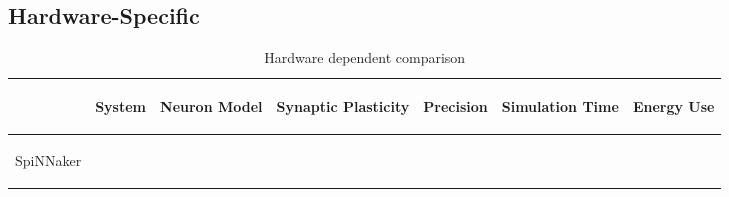 \subsection{Hardware-Specific}
\label{subsec:hw}
\begin{table*}[thb!]
  \caption{Hardware dependent comparison}
  \begin{center}
      \bgroup
      \def\arraystretch{1.4}
    \begin{tabular}{l c c c c c c}
      $ $ & 
       \begin{mycell}{2.0cm} System \end{mycell} & 
       
       \begin{mycell}{2.0cm} Neuron Model \end{mycell} & 
       \begin{mycell}{2.0cm} Synaptic Plasticity \end{mycell} & 
       \begin{mycell}{2.0cm} Precision \end{mycell} &  
       \begin{mycell}{2.0cm} Simulation Time \end{mycell} & 
       \begin{mycell}{2.0cm} Energy Use \end{mycell} 
	   \\
       \hline
       \begin{mycell}{1.8cm} SpiNNaker \citep{strometal} \end{mycell} &

\end{tabular}
\end{center}
\end{table*}
